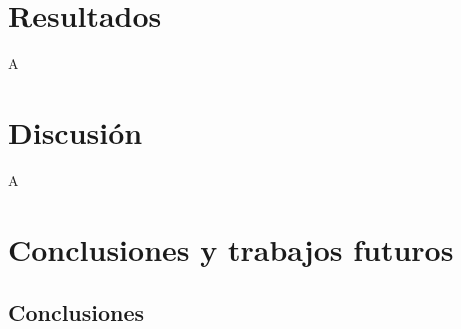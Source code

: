\documentclass[IB,BIB]{TFUOC}%
\begin{document}
\chapter{Resultados}



% 

A




\chapter{Discusión}


A




\chapter{Conclusiones y trabajos futuros}

\section{Conclusiones}
\end{document}
